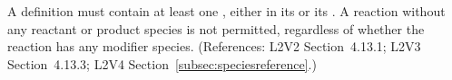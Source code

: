 A \Reaction definition must contain at least one \SpeciesReference, either
in its  or its .  A reaction
without any reactant or product species is not permitted, regardless of
whether the reaction has any modifier species.  (References: L2V2
Section~4.13.1; L2V3 Section~4.13.3; L2V4 Section~\ref{subsec:speciesreference}.)

